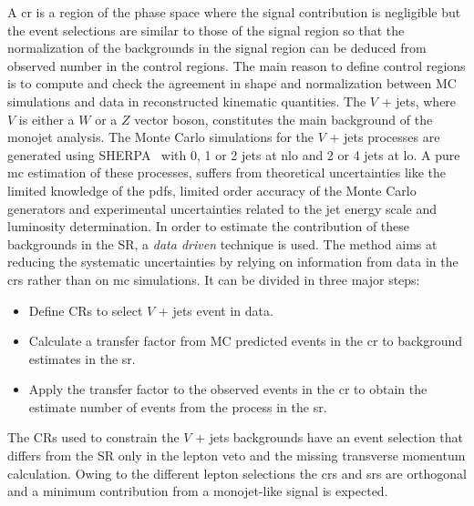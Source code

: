 A \gls{cr} is a region of the phase space where the signal contribution is
negligible but the event selections are similar to those of the signal region so
that the normalization of the backgrounds in the signal region can be deduced
from observed number in the control regions. The main reason to define control
regions is to compute and check the agreement in shape and normalization between
MC simulations and data in reconstructed kinematic quantities. The $V$ + jets,
where $V$ is either a $W$ or a $Z$ vector boson, constitutes the main background
of the monojet analysis. The Monte Carlo simulations for the $V$ + jets
processes are generated using SHERPA~\cite{SHERPA} with 0, 1 or 2 jets at
\gls{nlo} and 2 or 4 jets at \gls{lo}. A pure \gls{mc} estimation of these
processes, suffers from theoretical uncertainties like the limited knowledge of
the \glspl{pdf}, limited order accuracy of the Monte Carlo generators and
experimental uncertainties related to the jet energy scale and luminosity
determination. In order to estimate the contribution of these backgrounds in the
SR, a \emph{data driven} technique is used. The method aims at reducing the
systematic uncertainties by relying on information from data in the \glspl{cr}
rather than on \gls{mc} simulations. It can be divided in three major steps:
\begin{itemize}
\item Define CRs to select $V$ + jets event in data.
\item Calculate a transfer factor from MC predicted events in the \gls{cr} to
  background estimates in the \gls{sr}\@.
\item Apply the transfer factor to the observed events in the \gls{cr} to obtain
  the estimate number of events from the process in the \gls{sr}\@.
\end{itemize}
The CRs used to constrain the $V$ + jets backgrounds have an event selection
that differs from the SR only in the lepton veto and the missing transverse
momentum calculation. Owing to the different lepton selections the \glspl{cr}
and \glspl{sr} are orthogonal and a minimum contribution from a monojet-like
signal is expected.
